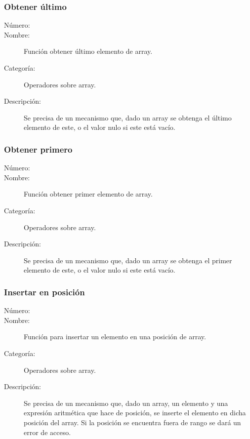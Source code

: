\subsubsection{Obtener último}
	\begin{description}
		\item [Número:] \cn
		\item [Nombre:] Función obtener último elemento de array.
		\item [Categoría:] Operadores sobre array.
		\item [Descripción:] Se precisa de un mecanismo que, dado un array se obtenga el 
último elemento de este, o el valor nulo si este está vacío.
	\end {description}

\subsubsection{Obtener primero}
	\begin{description}
		\item [Número:] \cn
		\item [Nombre:] Función obtener primer elemento de array.
		\item [Categoría:] Operadores sobre array.
		\item [Descripción:] Se precisa de un mecanismo que, dado un array se obtenga el 
primer elemento de este, o el valor nulo si este está vacío.
	\end {description}

\subsubsection{Insertar en posición}
	\begin{description}
		\item [Número:] \cn
		\item [Nombre:] Función para insertar un elemento en una posición de  array.
		\item [Categoría:] Operadores sobre array.
		\item [Descripción:] Se precisa de un mecanismo que, dado un array, un elemento
y una expresión aritmética que hace de posición, se inserte el elemento en dicha posición del array.
Si la posición se encuentra fuera de rango se dará un error de acceso.
	\end {description}

